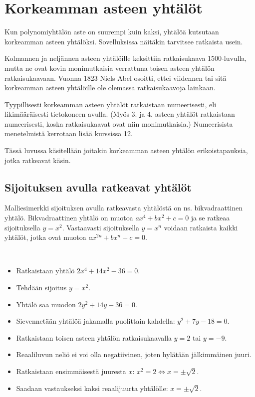 \chapter{Korkeamman asteen yhtälöt}

Kun polynomiyhtälön aste on suurempi kuin kaksi, yhtälöä kutsutaan korkeamman asteen yhtälöksi. Sovelluksissa näitäkin tarvitsee ratkaista usein.

Kolmannen ja neljännen asteen yhtälöille keksittiin ratkaisukaava 1500-luvulla, mutta
ne ovat kovin monimutkaisia verrattuna toisen asteen yhtälön ratkaisukaavaan. 
Vuonna 1823 Niels Abel osoitti, ettei viidennen tai sitä korkeamman asteen yhtälöille ole olemassa ratkaisukaavoja lainkaan.

Tyypillisesti korkeamman asteen yhtälöt ratkaistaan numeerisesti, eli likimääräisesti tietokoneen avulla. (Myös 3. ja 4. asteen yhtälöt ratkaistaan numeerisesti, koska ratkaisukaavat ovat niin monimutkaisia.) Numeerisista menetelmistä kerrotaan lisää kurssissa 12.

Tässä luvussa
käsitellään joitakin korkeamman asteen yhtälön erikoistapauksia, jotka ratkeavat käsin. 

\section{Sijoituksen avulla ratkeavat yhtälöt}

Malliesimerkki sijoituksen avulla ratkeavasta yhtälöstä on ns. bikvadraattinen yhtälö.
Bikvadraattinen yhtälö on muotoa $ax^4+bx^2+c=0$ ja se ratkeaa sijoituksella $y=x^2$.
Vastaavasti sijoituksella $y=x^n$ voidaan ratkaista kaikki yhtälöt, jotka ovat muotoa $ax^{2n}+bx^n+c=0$.

\begin{esimerkki}{\ }
\begin{itemize}
    \item Ratkaistaan yhtälö $2x^4+14x^2-36=0$.
    \item Tehdään sijoitus $y=x^2$.
    \item Yhtälö saa muodon $2y^2+14y-36=0$.
    \item Sievennetään yhtälöä jakamalla puolittain kahdella: $y^2+7y-18=0$.
    \item Ratkaistaan toisen asteen yhtälön ratkaisukaavalla $y=2$ tai $y=-9$.
    \item Reaaliluvun neliö ei voi olla negatiivinen, joten hylätään jälkimmäinen juuri.
    \item Ratkaistaan ensimmäisestä juuresta $x$: $x^2=2 \Leftrightarrow  x=\pm\sqrt{2}$.
    \item Saadaan vastaukseksi kaksi reaalijuurta yhtälölle: $x=\pm\sqrt{2}$.
\end{itemize}
\end{esimerkki}

